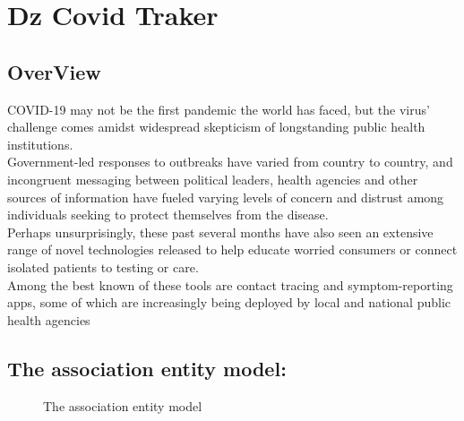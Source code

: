 \chapter{Dz Covid Traker}

\section{OverView}
COVID-19 may not be the first pandemic the world has faced, but the virus' challenge comes amidst widespread skepticism of longstanding public health institutions.\\

Government-led responses to outbreaks have varied from country to country, and incongruent messaging between political leaders, health agencies and other sources of information have fueled varying levels of concern and distrust among individuals seeking to protect themselves from the disease.\\

Perhaps unsurprisingly, these past several months have also seen an extensive range of novel technologies released to help educate worried consumers or connect isolated patients to testing or care.\\

Among the best known of these tools are contact tracing and symptom-reporting apps, some of which are increasingly being deployed by local and national public health agencies
\newpage
\section{The association entity model:}


\begin{figure}[!htb]
        \caption{\label{fig:my-label} The association entity model}
     \end{figure}
     

